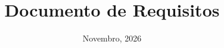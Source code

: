 \documentclass[a4paper,12pt]{article}
\title{Documento de Requisitos}
\date{Novembro, 2026}
\begin{document}
\maketitle



\newpage
\renewcommand{\contentsname}{Sumário}
\tableofcontents
\newpage


\newpage

\newpage

\newpage

\newpage

\newpage

\newpage

\newpage

\newpage

\newpage

\end{document}
